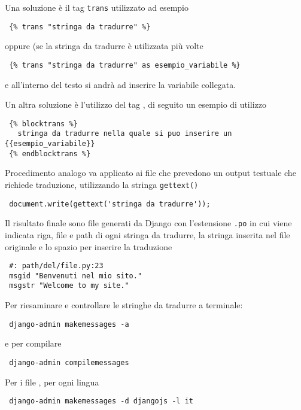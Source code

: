 Una soluzione è il tag \texttt{trans} utilizzato ad esempio
\begin{footnotesize}
\begin{verbatim}
 {% trans "stringa da tradurre" %}
\end{verbatim}
\end{footnotesize}
oppure (se la stringa da tradurre è utilizzata più volte
\begin{footnotesize}
\begin{verbatim}
 {% trans "stringa da tradurre" as esempio_variabile %}
\end{verbatim}
\end{footnotesize}
e all'interno del testo si andrà ad inserire la variabile collegata.

Un altra soluzione è l'utilizzo del tag , di seguito un esempio di utilizzo
\begin{footnotesize}
\begin{verbatim}
 {% blocktrans %} 
   stringa da tradurre nella quale si puo inserire un {{esempio_variabile}}
 {% endblocktrans %}
\end{verbatim}
\end{footnotesize}

Procedimento analogo va applicato ai file {\js} che prevedono un output testuale che richiede traduzione, utilizzando la stringa \texttt{gettext()}
\begin{footnotesize}
\begin{verbatim}
 document.write(gettext('stringa da tradurre'));
\end{verbatim}
\end{footnotesize}

Il risultato finale sono file generati da Django con l'estensione \texttt{.po} in cui viene indicata riga, file e path di ogni stringa da tradurre, la stringa inserita nel file originale e lo spazio per inserire la traduzione
\begin{footnotesize}
\begin{verbatim}
 #: path/del/file.py:23
 msgid "Benvenuti nel mio sito."
 msgstr "Welcome to my site."
\end{verbatim}
\end{footnotesize}

Per riesaminare e controllare le stringhe da tradurre a terminale:
\begin{footnotesize}
\begin{verbatim}
 django-admin makemessages -a
\end{verbatim}
\end{footnotesize}
e per compilare
\begin{footnotesize}
\begin{verbatim}
 django-admin compilemessages
\end{verbatim}
\end{footnotesize}

Per i file {\js}, per ogni lingua
\begin{footnotesize}
\begin{verbatim}
 django-admin makemessages -d djangojs -l it
\end{verbatim}
\end{footnotesize}
